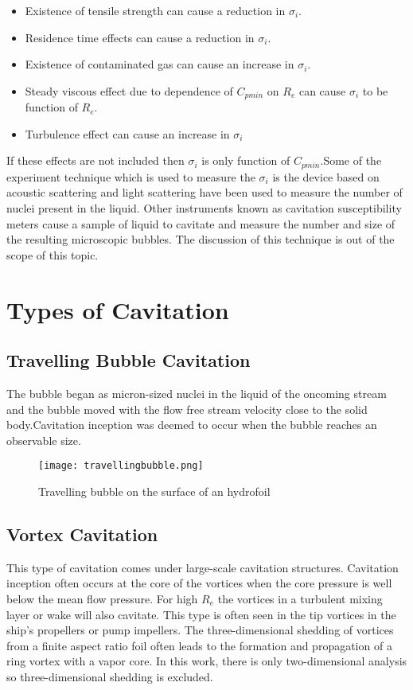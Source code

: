 \begin{itemize}
  \item Existence of tensile strength can cause a reduction in
    ${\sigma}_i$.
  \item Residence time effects can cause a reduction in ${\sigma}_i$.
  \item Existence of contaminated gas can cause an increase in
    ${\sigma}_i$.
  \item Steady viscous effect due to dependence of $C_{pmin}$ on $R_e$
    can cause ${\sigma}_i$ to be function of $R_e$.
  \item Turbulence effect can cause an increase in ${\sigma}_i$
\end{itemize}

If these effects are not included then ${\sigma}_i$ is only function
of $C_{pmin}$.Some of the experiment technique which is used to
measure the ${\sigma}_i$ is the device based on acoustic scattering
and light scattering have been used to measure the number of nuclei
present in the liquid. Other instruments known as cavitation
susceptibility meters cause a sample of liquid to cavitate and measure
the number and size of the resulting microscopic bubbles. The
discussion of this technique is out of the scope of this topic.

\section{Types of Cavitation}

\subsection{Travelling Bubble Cavitation}
The bubble began as micron-sized nuclei in the liquid of the oncoming
stream and the bubble moved with the flow free stream velocity close
to the solid body.Cavitation inception was deemed to occur when the
bubble reaches an observable size.

\begin{figure}[H]
  \centering
  \texttt{[image: travellingbubble.png]}
  \caption{Travelling bubble on the surface of an hydrofoil}
  \label{fig:fig6}
\end{figure}

\subsection{Vortex Cavitation}
This type of cavitation comes under large-scale cavitation
structures. Cavitation inception often occurs at the core of the
vortices when the core pressure is well below the mean flow pressure.
For high $R_e$ the vortices in a turbulent mixing layer or wake will
also cavitate. This type is often seen in the tip vortices in the
ship's propellers or pump impellers.  The three-dimensional shedding
of vortices from a finite aspect ratio foil often leads to the
formation and propagation of a ring vortex with a vapor core. In this
work, there is only two-dimensional analysis so three-dimensional
shedding is excluded.

